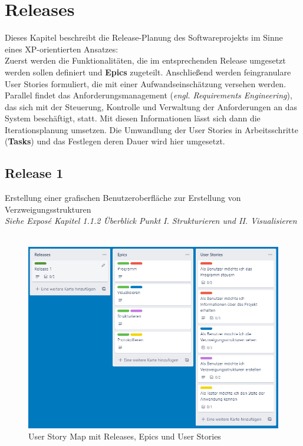 \documentclass[11pt]{article}
\begin{document}
    \section{Releases}
    Dieses Kapitel beschreibt die Release-Planung des Softwareprojekts im Sinne eines XP-orientierten Ansatzes:\\
    Zuerst werden die Funktionalitäten, die im entsprechenden Release umgesetzt werden sollen definiert und \textbf{Epics}
    zugeteilt.
    Anschließend werden feingranulare User Stories formuliert, die mit einer Aufwandseinschätzung versehen werden.
    Parallel findet das Anforderungsmanagement (\textit{engl. Requirements Engineering}), das sich mit der Steuerung,
    Kontrolle und Verwaltung der Anforderungen an das System beschäftigt, statt.
    Mit diesen Informationen lässt sich dann die Iterationsplanung umsetzen.
    Die Umwandlung der User Stories in Arbeitsschritte (\textbf{Tasks}) und das Festlegen deren Dauer wird hier umgesetzt.

    \subsection{Release 1}
    Erstellung einer grafischen Benutzeroberfläche zur Erstellung von Verzweigungsstrukturen\\
    \textit{Siehe Exposé Kapitel 1.1.2 Überblick Punkt I. Strukturieren und II. Visualisieren}\\~\\
    \begin{figure}[H]
        \centering
        \includegraphics[width=12cm]{../images/User_Story_Map.PNG}
        \caption{User Story Map mit Releases, Epics und User Stories}
    \end{figure}
\end{document}

